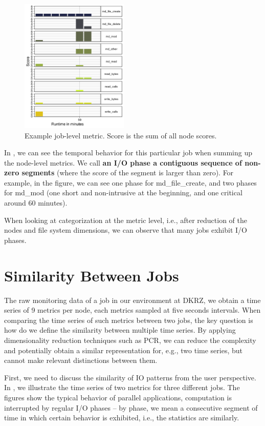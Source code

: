 \documentclass[]{llncs}
\begin{document}
\begin{figure}[!bt]
	\centering
	\includegraphics[width=2.02in,height=2.52in]{./media/image4.png}
	\caption{Example job-level metric. Score is the sum of all node scores.}
	\label{fig:seg_example}
\end{figure}

In , we can see the temporal behavior for this particular job when summing up the node-level metrics.
We call \textbf{an I/O phase a contiguous sequence of non-zero segments} (where the score of the segment is larger than zero).
For example, in the figure, we can see one phase for md\_file\_create, and two phases for md\_mod (one short and non-intrusive at the beginning, and one critical around 60 minutes).

When looking at categorization at the metric level, i.e., after reduction of the nodes and file system dimensions, we can observe that many jobs exhibit I/O phases.

\section{Similarity Between Jobs}
The raw monitoring data of a job in our environment at DKRZ, we obtain a time series of 9 metrics per node, each metrics sampled at five seconds intervals.
When comparing the time series of such metrics between two jobs, the key question is how do we define the similarity between multiple time series.
By applying dimensionality reduction techniques such as PCR, we can reduce the complexity and potentially obtain a similar representation for, e.g., two time series, but cannot make relevant distinctions between them.

First, we need to discuss the similarity of IO patterns from the user perspective.
In , we illustrate the time series of two metrics for three different jobs.
The figures show the typical behavior of parallel applications, computation is interrupted by regular I/O phases -- by phase, we mean a consecutive segment of time in which  certain behavior is exhibited, i.e., the statistics are similarly.
\end{document}
